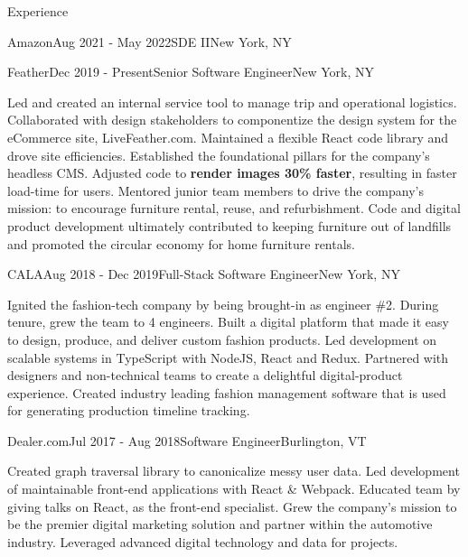 \documentclass{resume} %
\begin{document}
\begin{rSection}{Experience}
\begin{rSubsection}{Amazon}{Aug 2021 - May 2022}{SDE II}{New York, NY}
\end{rSubsection}


\begin{rSubsection}{Feather}{Dec 2019 - Present}{Senior Software Engineer}{New York, NY}

Led and created an internal service tool to manage trip and operational logistics.
Collaborated with design stakeholders to componentize the design system for the eCommerce
site, LiveFeather.com. Maintained a flexible React code library and drove site efficiencies.
Established the foundational pillars for the company’s headless CMS. Adjusted code to {\bf render
images 30\% faster}, resulting in faster load-time for users. Mentored junior team members to
drive the company’s mission: to encourage furniture rental, reuse, and refurbishment. Code
and digital product development ultimately contributed to keeping furniture out of landfills
and promoted the circular economy for home furniture rentals.

\end{rSubsection}


\begin{rSubsection}{CALA}{Aug 2018 - Dec 2019}{Full-Stack Software Engineer}{New York, NY}

Ignited the fashion-tech company by being brought-in as engineer \#2. During tenure, grew
the team to 4 engineers. Built a digital platform that made it easy to design, produce,
and deliver custom fashion products. Led development on scalable systems in TypeScript with
NodeJS, React and Redux. Partnered with designers and non-technical teams to create a
delightful digital-product experience. Created industry leading fashion management software
that is used for generating production timeline tracking.

\end{rSubsection}


\begin{rSubsection}{Dealer.com}{Jul 2017 - Aug 2018}{Software Engineer}{Burlington, VT}

Created graph traversal library to canonicalize messy user data. Led development of
maintainable front-end applications with React \& Webpack. Educated team by giving talks
on React, as the front-end specialist. Grew the company’s mission to be the premier
digital marketing solution and partner within the automotive industry. Leveraged
advanced digital technology and data for projects.


\end{rSubsection}
\end{rSection}
\end{document}
